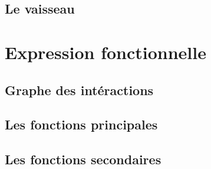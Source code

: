 \documentclass[a4paper,11pt]{report}
\begin{document}
    \section{Le vaisseau}

\chapter{Expression fonctionnelle}
    \section{Graphe des intéractions}

    \section{Les fonctions principales}

    \section{Les fonctions secondaires}
\end{document}

